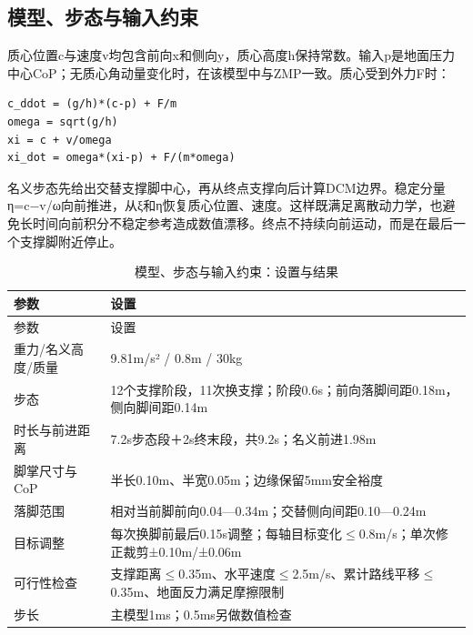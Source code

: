 \subsection{模型、步态与输入约束}\label{s17-detail-2}

质心位置c与速度v均包含前向x和侧向y，质心高度h保持常数。输入p是地面压力中心CoP；无质心角动量变化时，在该模型中与ZMP一致。质心受到外力F时：

\begin{Verbatim}[breaklines=true,breakanywhere=true,fontsize=\footnotesize]
c_ddot = (g/h)*(c-p) + F/m
omega = sqrt(g/h)
xi = c + v/omega
xi_dot = omega*(xi-p) + F/(m*omega)
\end{Verbatim}

名义步态先给出交替支撑脚中心，再从终点支撑向后计算DCM边界。稳定分量η=c−v/ω向前推进，从ξ和η恢复质心位置、速度。这样既满足离散动力学，也避免长时间向前积分不稳定参考造成数值漂移。终点不持续向前运动，而是在最后一个支撑脚附近停止。

\FloatBarrier\begingroup\small\setlength{\tabcolsep}{2.5pt}
\begin{longtable}[]{@{}
  >{\raggedright\arraybackslash}p{}
  >{\raggedright\arraybackslash}p{}@{}}
\caption{模型、步态与输入约束：设置与结果}\label{tab:s17-2}\tabularnewline
\toprule\noalign{}
\begin{minipage}[b]{\linewidth}\raggedright
参数
\end{minipage} & \begin{minipage}[b]{\linewidth}\raggedright
设置
\end{minipage} \\
\midrule\noalign{}
\endfirsthead
\toprule\noalign{}
\begin{minipage}[b]{\linewidth}\raggedright
参数
\end{minipage} & \begin{minipage}[b]{\linewidth}\raggedright
设置
\end{minipage} \\
\midrule\noalign{}
\endhead
\bottomrule\noalign{}
\endlastfoot
重力/名义高度/质量 & 9.81m/s² / 0.8m / 30kg \\
步态 & 12个支撑阶段，11次换支撑；阶段0.6s；前向落脚间距0.18m，侧向脚间距0.14m \\
时长与前进距离 & 7.2s步态段＋2s终末段，共9.2s；名义前进1.98m \\
脚掌尺寸与CoP & 半长0.10m、半宽0.05m；边缘保留5mm安全裕度 \\
落脚范围 & 相对当前脚前向0.04---0.34m；交替侧向间距0.10---0.24m \\
目标调整 & 每次换脚前最后0.15s调整；每轴目标变化\(\leq\)0.8m/s；单次修正裁剪±0.10m/±0.06m \\
可行性检查 & 支撑距离\(\leq\)0.35m、水平速度\(\leq\)2.5m/s、累计路线平移\(\leq\)0.35m、地面反力满足摩擦限制 \\
步长 & 主模型1ms；0.5ms另做数值检查 \\
\end{longtable}\endgroup

